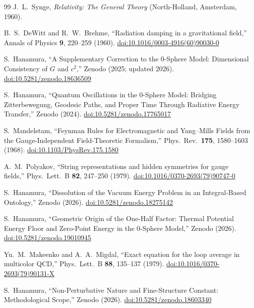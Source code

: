 \documentclass[%
 reprint, amsmath,amssymb, aps, prb, ]{revtex4-2}
\numberwithin{equation}{section}
\begin{document}
\begin{thebibliography}{99}
J.~L.~Synge, \textit{Relativity: The General Theory} (North-Holland, Amsterdam, 1960).

B.~S.~DeWitt and R.~W.~Brehme, ``Radiation damping in a gravitational field,'' Annals of Physics \textbf{9}, 220--259 (1960). \href{https://doi.org/10.1016/0003-4916(60)90030-0}{doi:10.1016/0003-4916(60)90030-0}

S.~Hanamura, ``A Supplementary Correction to the 0-Sphere Model: Dimensional Consistency of $G$ and $c^2$,'' Zenodo (2025; updated 2026). \href{https://doi.org/10.5281/zenodo.18636509}{doi:10.5281/zenodo.18636509}

S.~Hanamura, ``Quantum Oscillations in the 0-Sphere Model: Bridging Zitterbewegung, Geodesic Paths, and Proper Time Through Radiative Energy Transfer,'' Zenodo (2024). \href{https://doi.org/10.5281/zenodo.17765017}{doi:10.5281/zenodo.17765017}

S.~Mandelstam, ``Feynman Rules for Electromagnetic and Yang--Mills Fields from the Gauge-Independent Field-Theoretic Formalism,'' Phys.\ Rev.\ \textbf{175}, 1580--1603 (1968). \href{https://doi.org/10.1103/PhysRev.175.1580}{doi:10.1103/PhysRev.175.1580}

A.~M.~Polyakov, ``String representations and hidden symmetries for gauge fields,'' Phys.\ Lett.\ B \textbf{82}, 247--250 (1979). \href{https://doi.org/10.1016/0370-2693(79)90747-0}{doi:10.1016/0370-2693(79)90747-0}

S.~Hanamura, ``Dissolution of the Vacuum Energy Problem in an Integral-Based Ontology,'' Zenodo (2026). \href{https://doi.org/10.5281/zenodo.18275142}{doi:10.5281/zenodo.18275142}

S.~Hanamura, ``Geometric Origin of the One-Half Factor: Thermal Potential Energy Floor and Zero-Point Energy in the 0-Sphere Model,'' Zenodo (2026). \href{https://doi.org/10.5281/zenodo.19010945}{doi:10.5281/zenodo.19010945}

Yu.~M.~Makeenko and A.~A.~Migdal, ``Exact equation for the loop average in multicolor QCD,'' Phys.\ Lett.\ B \textbf{88}, 135--137 (1979). \href{https://doi.org/10.1016/0370-2693(79)90131-X}{doi:10.1016/0370-2693(79)90131-X}

S.~Hanamura, ``Non-Perturbative Nature and Fine-Structure Constant: Methodological Scope,'' Zenodo (2026). \href{https://doi.org/10.5281/zenodo.18603340}{doi:10.5281/zenodo.18603340}


\end{thebibliography}
\end{document}
